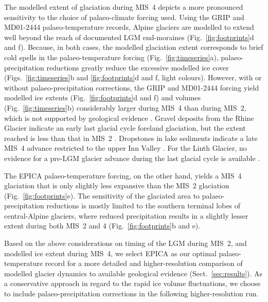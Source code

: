 \documentclass[tc, manuscript]{copernicus}
\begin{document}
    The modelled extent of glaciation during MIS~4 depicts a more pronounced
    sensitivity to the choice of palaeo-climate forcing used. Using the GRIP
    and MD01-2444 palaeo-temperature records, Alpine glaciers are modelled to
    extend well beyond the reach of documented LGM end-moraines
    (Fig.~\ref{fig:footprints}d and f). Because, in both cases,
    the modelled glaciation extent corresponds to brief cold spells in the
    palaeo-temperature forcing (Fig.~\ref{fig:timeseries}a),
    palaeo-precipitation reductions greatly reduce the excessive modelled ice
    cover (Figs.~\ref{fig:timeseries}b and \ref{fig:footprints}d and f, light
    colours). However, with or without palaeo-precipitation corrections,
    the GRIP and MD01-2444 forcing yield
    modelled ice extents (Fig.~\ref{fig:footprints}d and f) and volumes
    (Fig.~\ref{fig:timeseries}b) considerably larger during MIS~4 than
    during MIS~2, which is not supported by geological evidence
    \citep{Preusser.2004, Ivy-Ochs.etal.2008, Husen.Reitner.2011,
    Barrett.etal.2017, Haldimann.etal.2017}. Gravel deposits from the Rhine
    Glacier indicate an early last glacial cycle foreland glaciation, but the
    extent reached is less than that in MIS~2 \citep{Keller.Krayss.2010}.
    Dropstones in lake sediments indicate a late MIS~4 advance restricted to
    the upper Inn Valley \citep{Barrett.etal.2017}. For the Linth Glacier, no
    evidence for a pre-LGM glacier advance during the last glacial cycle is
    available \citep{Haldimann.etal.2017}.

    The EPICA palaeo-temperature forcing, on the other hand, yields a MIS~4
    glaciation that is only slightly less expansive than the MIS~2 glaciation
    (Fig.~\ref{fig:footprints}e). The sensitivity of the glaciated area to
    palaeo-precipitation reductions is mostly limited to the southern terminal
    lobes of central-Alpine glaciers, where reduced precipitation results in a
    slightly lesser extent during both MIS~2 and 4 (Fig.~\ref{fig:footprints}b
    and e).

    Based on the above considerations on timing of the LGM during MIS~2, and
    modelled ice
    extent during MIS~4, we select EPICA as our optimal palaeo-temperature
    record for a more detailed and higher-resolution comparison of modelled
    glacier dynamics to available geological evidence
    (Sect.~\ref{sec:results}). As a conservative approach in regard to the
    rapid ice volume fluctuations, we choose to include palaeo-precipitation
    corrections in the following higher-resolution run.
\end{document}
